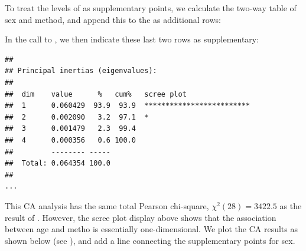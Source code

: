 \documentclass[11pt]{book}
\renewenvironment{knitrout}{\small\renewcommand{\baselinestretch}{.85}}{} %
\begin{document}
To treat the levels of  as supplementary points, we calculate
the two-way table of sex and method, and append this to the 
 as additional rows:

\begin{knitrout}
\color{fgcolor}\begin{kframe}
\begin{alltt}
 \hlkwb{<-}  \hlopt{~}  \hlopt{+}  
 \hlkwb{<-} 
\end{alltt}
\end{kframe}
\end{knitrout}
In the call to , we then indicate these last two rows
as supplementary:
\begin{knitrout}
\color{fgcolor}\begin{kframe}
\begin{alltt}
 \hlkwb{<-}  \hlstd{=}\hlopt{:}\hlstd{)}
\end{alltt}
\begin{verbatim}
## 
## Principal inertias (eigenvalues):
## 
##  dim    value      %   cum%   scree plot               
##  1      0.060429  93.9  93.9  *************************
##  2      0.002090   3.2  97.1  *                        
##  3      0.001479   2.3  99.4                           
##  4      0.000356   0.6 100.0                           
##         -------- -----                                 
##  Total: 0.064354 100.0                                 
## 
...
\end{verbatim}
\end{kframe}
\end{knitrout}
This CA analysis has the same total Pearson chi-square,
$\chi^2 (28) = 3422.5$ as the result of .
However, the scree plot display above shows that the association between age and metho
is essentially one-dimensional.  We plot the CA results as shown below 
(see ), and
add a line connecting the supplementary points for sex.
\end{document}
